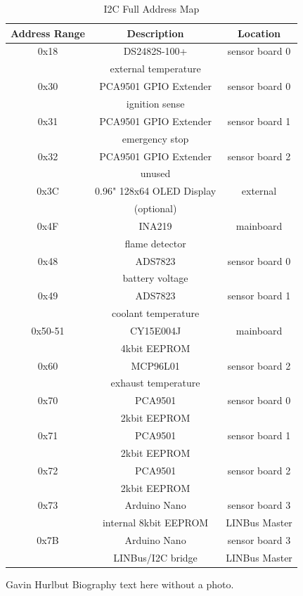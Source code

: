 \documentclass[lettersize,journal]{IEEEtran}
\begin{document}
\begin{table}
\begin{center}
\caption{I2C Full Address Map}
\label{i2c-full}
\begin{tabular}{| c | c | c |}
\hline
Address Range & Description & Location \\
\hline
0x18 & DS2482S-100+ & sensor board 0 \\
& external temperature & \\
\hline
0x30 & PCA9501 GPIO Extender & sensor board 0 \\
& ignition sense & \\
\hline
0x31 & PCA9501 GPIO Extender & sensor board 1 \\
& emergency stop & \\
\hline
0x32 & PCA9501 GPIO Extender & sensor board 2 \\
& unused & \\
\hline
0x3C & 0.96" 128x64 OLED Display & external \\
& (optional) & \\
\hline
0x4F & INA219 & mainboard \\
& flame detector & \\
\hline
0x48 & ADS7823 & sensor board 0 \\
& battery voltage & \\
\hline
0x49 & ADS7823 & sensor board 1 \\
& coolant temperature & \\
\hline
0x50-51 & CY15E004J & mainboard \\
& 4kbit EEPROM & \\
\hline
0x60 & MCP96L01 & sensor board 2 \\
&  exhaust temperature & \\
\hline
0x70 & PCA9501 & sensor board 0 \\
& 2kbit EEPROM & \\
\hline
0x71 & PCA9501 & sensor board 1 \\
& 2kbit EEPROM & \\
\hline
0x72 & PCA9501 & sensor board 2 \\
& 2kbit EEPROM & \\
\hline
0x73 & Arduino Nano & sensor board 3 \\
& internal 8kbit EEPROM & LINBus Master \\
\hline
0x7B & Arduino Nano & sensor board 3 \\
& LINBus/I2C bridge & LINBus Master \\
\hline
\end{tabular}
\end{center}
\end{table}



\begin{IEEEbiographynophoto}{Gavin Hurlbut}
Biography text here without a photo.
\end{IEEEbiographynophoto}
\end{document}
